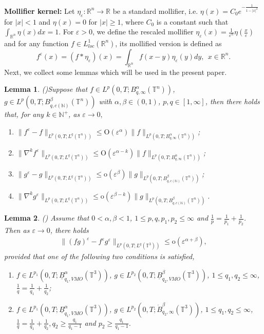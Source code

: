 \documentclass[11pt]{article}
\theoremstyle{plain}\newtheorem{definition}{Definition}[section]
\theoremstyle{definition}\newtheorem{theorem}{Theorem}[section]
\theoremstyle{plain}\newtheorem{lemma}[theorem]{Lemma}
\theoremstyle{plain}\newtheorem{coro}[theorem]{Corollary}
\theoremstyle{plain}\newtheorem{prop}[theorem]{Proposition}
\theoremstyle{remark}\newtheorem{remark}{Remark}[section]
\newcommand{\f}{\frac}
\numberwithin{equation}{section}
\begin{document}
{\bf Mollifier kernel:} Let $\eta_{\varepsilon}:\mathbb{R}^{n}\rightarrow \mathbb{R}$ be a standard mollifier, i.e. $\eta(x)=C_0e^{-\frac{1}{1-|x|^2}}$ for $|x|<1$ and $\eta(x)=0$ for $|x|\geq 1$, where $C_0$ is a constant such that $\int_{\mathbb{R}^n}\eta (x) dx=1$. For $\varepsilon>0$, we define the rescaled mollifier $\eta_{\varepsilon}(x)=\frac{1}{\varepsilon^n}\eta(\frac{x}{\varepsilon})$ and for  any function $f\in L^1_{loc}(\mathbb{R}^n)$, its mollified version is defined as
$$f^\varepsilon(x)=(f*\eta_{\varepsilon})(x)=\int_{\mathbb{R}^n}f(x-y)\eta_{\varepsilon}(y)dy,\ \ x\in \mathbb{R}^n.$$
Next, we collect  some lemmas  which will be used in the present paper.
\begin{lemma}(\cite{[Chae],[Yu]})\label{lem2.2}
 Suppose that  $f\in L^p(0,T; {B}^\alpha_{q,\infty}(\mathbb{T}^{n}))$, $g\in L^p(0,T;{B}^\beta_{q,c(\mathbb{N})}(\mathbb{T}^{n}))$ with $\alpha, \beta\in (0,1)$,  $ p,q\in [1,\infty]$,   then there holds that,  for any $k\in \mathbb{N}^+$, as $\varepsilon\rightarrow0,$
 \begin{enumerate}[(1)]
 \item $ \|f^{\varepsilon} -f \|_{L^{p}(0,T;L^{q}(\mathbb{T}^{n}))}\leq \text{O}(\varepsilon^{\alpha})\|f\|_{L^p(0,T; {B}^\alpha_{q,\infty}(\mathbb{T}^n))} $;
   \item   $ \|\nabla^{k}f^{\varepsilon}  \|_{L^{p}(0,T;L^{q}(\mathbb{T}^{n}))}\leq \text{O}(\varepsilon^{\alpha-k})\|f\|_{L^p(0,T; {B}^\alpha_{q,\infty}(\mathbb{T}^{n}))} $;
       \item $ \|g^{\varepsilon} -g \|_{L^{p}(0,T;L^{q}(\mathbb{T}^{n}))}\leq \text{o}(\varepsilon^{\beta})\|g\|_{L^p(0,T; {B}^\beta_{q,c(\mathbb{N})}(\mathbb{T}^{n}))} $;
   \item   $ \|\nabla^{k}g^{\varepsilon}  \|_{L^{p}(0,T;L^{q}(\mathbb{T}^{n}))}\leq \text{o}(\varepsilon^{\beta-k})\|g
       \|_{L^p(0,T; {B}^\beta_{q,c(\mathbb{N})}(\mathbb{T}^{n}))}$.
 \end{enumerate}
\end{lemma}
\begin{lemma}(\cite{[YWL]})	\label{lem2.3}
	Assume that $0<\alpha,\beta<1$, $1\leq p,q,p_{1},p_{2}\leq\infty$ and $\frac{1}{p}=\frac{1}{p_1}+\frac{1}{p_2}$.
Then as $\varepsilon\to 0$, there holds
	\begin{align} \label{cet}
		\|(fg)^{\varepsilon}- f^{\varepsilon}g^{\varepsilon}\|_{L^p(0,T;L^q(\mathbb{T}^3))} \leq  \text{o}(\varepsilon^{\alpha+\beta}),
	\end{align}
provided that one of the following two conditions is satisfied,
\begin{enumerate}[(1)]
\item  $f\in L^{p_1}(0,T;\underline{B}^{\alpha}_{q_1,VMO} (\mathbb{T}^3) )$, $g\in L^{p_2}(0,T;\underline{B}^{\beta}_{q_2,VMO}(\mathbb{T}^3)  )$, $1\leq q_{1},q_{2}\leq\infty$, $\frac{1}{q}=\frac{1}{q_1}+\frac{1}{q_2}$;
 \item  $f\in L^{p_1}(0,T;\underline{B}^{\alpha}_{q_{1},VMO}(\mathbb{T}^3))$, $g\in L^{p_2}(0,T;\dot{B}^{\beta}_{q_{2},\infty} (\mathbb{T}^3))$, $1\leq q_{1},q_{2}\leq\infty$, $\frac{1}{q}=\frac{1}{q_1}+\frac{1}{q_2},q_{2}\geq \f{q_{1}}{q_{1}-1}$ and $p_{2}\geq\f{q_{1}}{q_{1}-1}$.
 \end{enumerate}\end{lemma}
\end{document}
